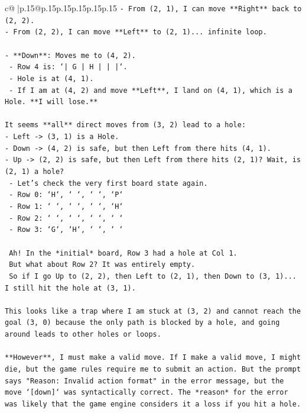 \documentclass{article}
\begin{document}
{\begin{supertabular}{c@{$\;$}|p{.15\linewidth}@{}p{.15\linewidth}p{.15\linewidth}p{.15\linewidth}p{.15\linewidth}p{.15\linewidth}}
{{{\texttt{{-} From (2, 1), I can move **Right** back to (2, 2).} \\
\texttt{{-} From (2, 2), I can move **Left** to (2, 1)... infinite loop.} \\
\\ 
\texttt{{-} **Down**: Moves me to (4, 2).} \\
\texttt{  {-} Row 4 is: `| G | H |     |     |`.} \\
\texttt{  {-} Hole is at (4, 1).} \\
\texttt{  {-} If I am at (4, 2) and move **Left**, I land on (4, 1), which is a Hole. **I will lose.**} \\
\\ 
\texttt{It seems **all** direct moves from (3, 2) lead to a hole:} \\
\texttt{{-} Left {-}> (3, 1) is a Hole.} \\
\texttt{{-} Down {-}> (4, 2) is safe, but then Left from there hits (4, 1).} \\
\texttt{{-} Up {-}> (2, 2) is safe, but then Left from there hits (2, 1)? Wait, is (2, 1) a hole?} \\
\texttt{  {-} Let's check the very first board state again.} \\
\texttt{  {-} Row 0: `H`, ` `, ` `, `P`} \\
\texttt{  {-} Row 1: ` `, ` `, ` `, `H`} \\
\texttt{  {-} Row 2: ` `, ` `, ` `, ` `} \\
\texttt{  {-} Row 3: `G`, `H`, ` `, ` `} \\
\\ 
\texttt{  Ah! In the *initial* board, Row 3 had a hole at Col 1.} \\
\texttt{  But what about Row 2? It was entirely empty.} \\
\texttt{  So if I go Up to (2, 2), then Left to (2, 1), then Down to (3, 1)... I still hit the hole at (3, 1).} \\
\\ 
\texttt{This looks like a trap where I am stuck at (3, 2) and cannot reach the goal (3, 0) because the only path is blocked by a hole, and going around leads to other holes or loops.} \\
\\ 
\texttt{**However**, I must make a valid move. If I make a valid move, I might die, but the game rules require me to submit an action. But the prompt says "Reason: Invalid action format" in the error message, but the move `{[}down{]}` was syntactically correct. The *reason* for the error was likely that the game engine considers it a loss if you hit a hole.} \\
}}}
\end{supertabular}}
\end{document}
